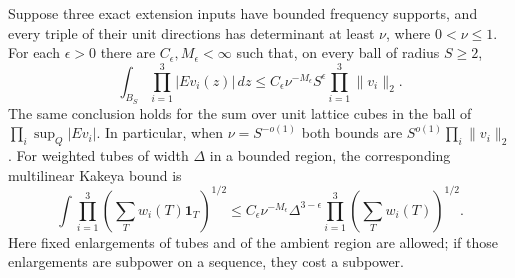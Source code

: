 \begin{lemma}
\label{lem:transverse-product}
Suppose three exact extension inputs have bounded frequency supports,
and every triple of their unit directions has determinant at least
$\nu$, where $0<\nu\le1$.  For each $\epsilon>0$ there are $C_\epsilon,M_\epsilon<\infty$
such that, on every ball of radius $S\ge2$,
\begin{equation}\label{eq:transverse-product}
 \int_{B_S}\prod_{i=1}^3|Ev_i(z)|\,dz
 \le C_\epsilon\nu^{-M_\epsilon}S^\epsilon
                         \prod_{i=1}^3\|v_i\|_2.
\end{equation}
The same conclusion holds for the sum over unit lattice cubes in the
ball of $\prod_i\sup_Q|Ev_i|$.  In particular, when $\nu=S^{-o(1)}$
both bounds are $S^{o(1)}\prod_i\|v_i\|_2$.
For weighted tubes of width $\Delta$ in a bounded region, the
corresponding multilinear Kakeya bound is
\begin{equation}\label{eq:transverse-kakeya}
 \int\prod_{i=1}^3
       \left(\sum_T w_i(T)\mathbf1_T\right)^{1/2}
 \le C_\epsilon\nu^{-M_\epsilon}\Delta^{3-\epsilon}
                  \prod_{i=1}^3\left(\sum_Tw_i(T)\right)^{1/2}.
\end{equation}
Here fixed enlargements of tubes and of the ambient region are allowed;
if those enlargements are subpower on a sequence, they cost a subpower.
\end{lemma}


